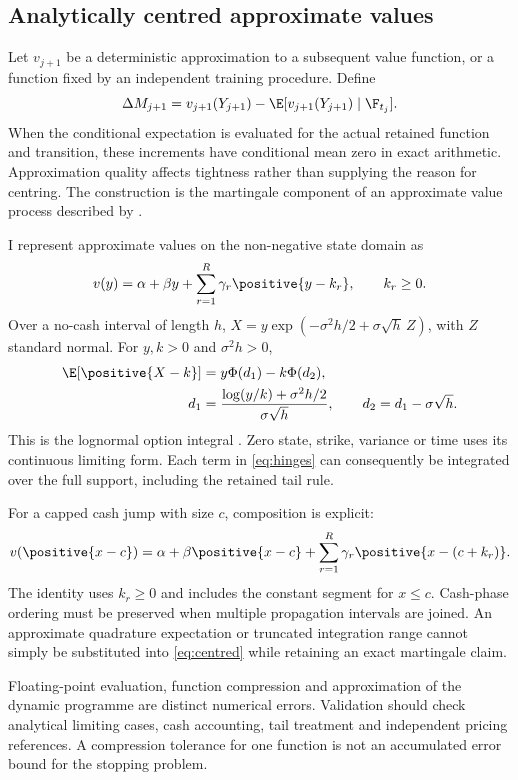 \subsection{Analytically centred approximate values}

Let $v_{j+1}$ be a deterministic approximation to a subsequent value function, or a function fixed by an independent training procedure. Define
\begin{equation}
 \Delta M_{j+1}=v_{j+1}(Y_{j+1})
 -\E[v_{j+1}(Y_{j+1})\mid\F_{t_j}].
\label{eq:centred}
\end{equation}
When the conditional expectation is evaluated for the actual retained function and transition, these increments have conditional mean zero in exact arithmetic. Approximation quality affects tightness rather than supplying the reason for centring. The construction is the martingale component of an approximate value process described by \citet{haugh2004}.

I represent approximate values on the non-negative state domain as
\begin{equation}
 v(y)=\alpha+\beta y+\sum_{r=1}^{R}\gamma_r\positive{y-k_r},
 \qquad k_r\geq0.
\label{eq:hinges}
\end{equation}
Over a no-cash interval of length $h$, $X=y\exp(-\sigma^2h/2+\sigma\sqrt h\,Z)$, with $Z$ standard normal. For $y,k>0$ and $\sigma^2h>0$,
\begin{align}
 \E[\positive{X-k}]&=y\Phi(d_1)-k\Phi(d_2),\\
 d_1&=\frac{\log(y/k)+\sigma^2h/2}{\sigma\sqrt h},\qquad
 d_2=d_1-\sigma\sqrt h.
\label{eq:hinge-integral}
\end{align}
This is the lognormal option integral \citep{black1973}. Zero state, strike, variance or time uses its continuous limiting form. Each term in \eqref{eq:hinges} can consequently be integrated over the full support, including the retained tail rule.

For a capped cash jump with size $c$, composition is explicit:
\begin{equation}
 v(\positive{x-c})
 =\alpha+\beta\positive{x-c}
 +\sum_{r=1}^{R}\gamma_r\positive{x-(c+k_r)}.
\label{eq:composition}
\end{equation}
The identity uses $k_r\geq0$ and includes the constant segment for $x\leq c$. Cash-phase ordering must be preserved when multiple propagation intervals are joined. An approximate quadrature expectation or truncated integration range cannot simply be substituted into \eqref{eq:centred} while retaining an exact martingale claim.

Floating-point evaluation, function compression and approximation of the dynamic programme are distinct numerical errors. Validation should check analytical limiting cases, cash accounting, tail treatment and independent pricing references. A compression tolerance for one function is not an accumulated error bound for the stopping problem.
